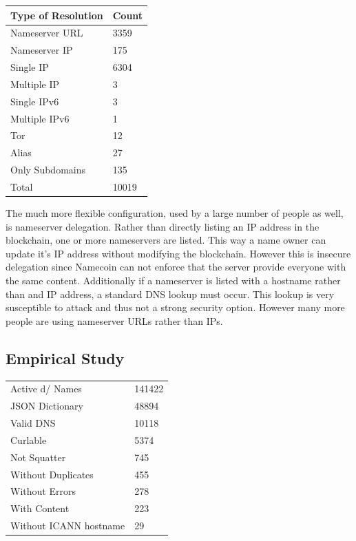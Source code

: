 \begin{table}[t]
\begin{tabular}{ll}
Type of Resolution & Count \\ \hline
Nameserver URL     & 3359  \\
Nameserver IP      & 175   \\
Single IP          & 6304  \\
Multiple IP        & 3     \\
Single IPv6        & 3     \\
Multiple IPv6      & 1     \\
Tor                & 12    \\
Alias              & 27    \\
Only Subdomains    & 135   \\ \hline
Total              & 10019
\end{tabular}
\end{table}


The much more flexible configuration, used by a large number of people as well, is nameserver delegation. Rather than directly listing an IP address in the blockchain, one or more nameservers are listed. This way a name owner can update it's IP address without modifying the blockchain. However this is insecure delegation since Namecoin can not enforce that the server provide everyone with the same content. Additionally if a nameserver is listed with a hostname rather than and IP address, a standard DNS lookup must occur. This lookup is very susceptible to attack and thus not a strong security option. However many more people are using nameserver URLs rather than IPs.

\subsection{Empirical Study}
\label{domainbreakdown}

\begin{table}[t]
\begin{tabular}{ll}
Active d/ Names     & 141422  \\
JSON Dictionary      & 48894   \\
Valid DNS          & 10118  \\
Curlable        & 5374     \\
Not Squatter        & 745     \\
Without Duplicates      & 455     \\
Without Errors              & 278    \\
With Content              & 223    \\
Without ICANN hostname   & 29   \\
\end{tabular}
\end{table}

